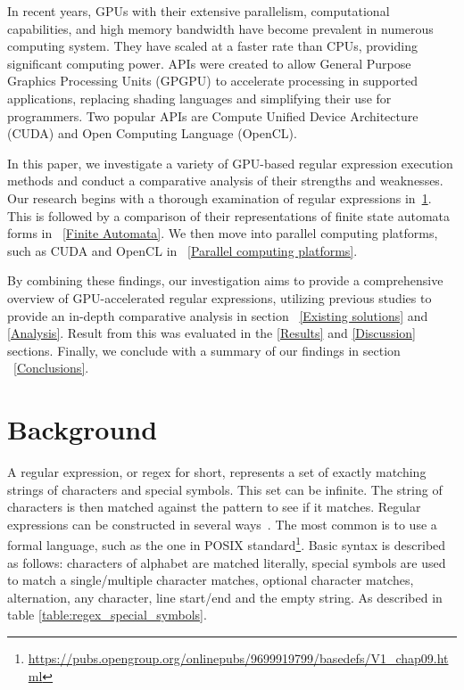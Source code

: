 \documentclass[10pt,onecolumn,twoside,english,a4paper]{article}
\begin{document}
In recent years, GPUs with their extensive parallelism, computational capabilities, and high memory bandwidth have become prevalent in numerous computing system. They have scaled at a faster rate than CPUs, providing significant computing power\cite{sun2019summarizing,Liu:Asynchronous}. APIs were created to allow General Purpose Graphics Processing Units (GPGPU) to accelerate processing in supported applications, replacing shading languages and simplifying their use for programmers. Two popular APIs are Compute Unified Device Architecture (CUDA) and Open Computing Language (OpenCL)\cite{Fang:Comparison-cuda-opencl}.

In this paper, we investigate a variety of GPU-based regular expression execution methods and conduct a comparative analysis of their strengths and weaknesses. Our research begins with a thorough examination of regular expressions in~\ref{Background}. This is followed by a comparison of their representations of finite state automata forms in ~\ref{Finite Automata}. We then move into parallel computing platforms, such as CUDA and OpenCL in ~\ref{Parallel computing platforms}.

By combining these findings, our investigation aims to provide a comprehensive overview of GPU-accelerated regular expressions, utilizing previous studies to provide an in-depth comparative analysis in section ~\ref{Existing solutions} and \ref{Analysis}. Result from this was evaluated in the \ref{Results} and \ref{Discussion} sections. Finally, we conclude with a summary of our findings in section ~\ref{Conclusions}.

\section{Background} \label{Background}
A regular expression, or regex for short, represents a set of exactly matching strings of characters and special symbols. This set can be infinite. The string of characters is then matched against the pattern to see if it matches. Regular expressions can be constructed in several ways~\cite{wang2014techniques}. The most common is to use a formal language, such as the one in POSIX standard\footnote{\url{https://pubs.opengroup.org/onlinepubs/9699919799/basedefs/V1_chap09.html}}.
Basic syntax is described as follows: characters of alphabet are matched literally, special symbols are used to match a single/multiple character matches, optional character matches, alternation, any character, line start/end and the empty string. As described in table \ref{table:regex_special_symbols}.
\end{document}
